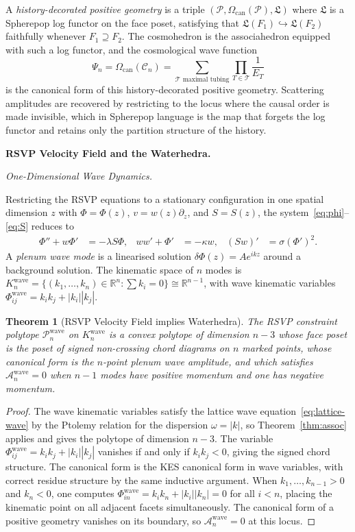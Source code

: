 \documentclass[11pt]{article}
\theoremstyle{plain}
\newtheorem{theorem}{Theorem}[section]
\theoremstyle{definition}
\theoremstyle{remark}
\newcommand{\R}{\mathbb{R}}
\newcommand{\Phif}{\Phi}
\newcommand{\vf}{v}
\newcommand{\Sf}{S}
\newcommand{\Log}{\mathfrak{L}}
\newcommand{\Amp}{\mathcal{A}}
\newcommand{\WF}{\Psi}
\newcommand{\Cosmo}{\mathcal{C}_n}
\newcommand{\CF}{\Omega_{\mathrm{can}}}
\begin{document}
A \emph{history-decorated positive geometry} is a triple $(\mathcal{P}, \CF(\mathcal{P}), \Log)$ where $\Log$ is a Spherepop log functor on the face poset, satisfying that $\Log(F_1) \hookrightarrow \Log(F_2)$ faithfully whenever $F_1 \supseteq F_2$. The cosmohedron is the associahedron equipped with such a log functor, and the cosmological wave function
\[
  \WF_n = \CF(\Cosmo) = \sum_{\mathcal{T}\text{ maximal tubing}} \prod_{T \in \mathcal{T}} \frac{1}{E_T}
\]
is the canonical form of this history-decorated positive geometry. Scattering amplitudes are recovered by restricting to the locus where the causal order is made invisible, which in Spherepop language is the map that forgets the log functor and retains only the partition structure of the history.

\bigskip\noindent\textbf{RSVP Velocity Field and the Waterhedra.}
\label{sec:water}

\medskip\noindent\textit{One-Dimensional Wave Dynamics.}

Restricting the RSVP equations to a stationary configuration in one spatial dimension $z$ with $\Phif = \Phif(z)$, $\vf = w(z)\partial_z$, and $\Sf = \Sf(z)$, the system~\eqref{eq:phi}--\eqref{eq:S} reduces to
\begin{align*}
  \Phif'' + w\Phif' &= -\lambda \Sf\Phif, &
  ww' + \Phif' &= -\kappa w, &
  (\Sf w)' &= \sigma(\Phif')^2.
\end{align*}
A \emph{plenum wave mode} is a linearised solution $\delta\Phif(z) = A e^{ikz}$ around a background solution. The kinematic space of $n$ modes is $K_n^{\mathrm{wave}} = \{(k_1,\ldots,k_n) \in \R^n : \sum k_i = 0\} \cong \R^{n-1}$, with wave kinematic variables $\Phif_{ij}^{\mathrm{wave}} = k_ik_j + |k_i||k_j|$.

\begin{theorem}[RSVP Velocity Field implies Waterhedra]
\label{thm:water}
The RSVP constraint polytope $\mathcal{P}_n^{\mathrm{wave}}$ on $K_n^{\mathrm{wave}}$ is a convex polytope of dimension $n-3$ whose face poset is the poset of signed non-crossing chord diagrams on $n$ marked points, whose canonical form is the $n$-point plenum wave amplitude, and which satisfies $\Amp_n^{\mathrm{wave}} = 0$ when $n-1$ modes have positive momentum and one has negative momentum.
\end{theorem}

\begin{proof}
The wave kinematic variables satisfy the lattice wave equation~\eqref{eq:lattice-wave} by the Ptolemy relation for the dispersion $\omega = |k|$, so Theorem~\ref{thm:assoc} applies and gives the polytope of dimension $n-3$. The variable $\Phif_{ij}^{\mathrm{wave}} = k_ik_j + |k_i||k_j|$ vanishes if and only if $k_ik_j < 0$, giving the signed chord structure. The canonical form is the KES canonical form in wave variables, with correct residue structure by the same inductive argument. When $k_1,\ldots,k_{n-1} > 0$ and $k_n < 0$, one computes $\Phif_{in}^{\mathrm{wave}} = k_i k_n + |k_i||k_n| = 0$ for all $i < n$, placing the kinematic point on all adjacent facets simultaneously. The canonical form of a positive geometry vanishes on its boundary, so $\Amp_n^{\mathrm{wave}} = 0$ at this locus.
\end{proof}
\end{document}
